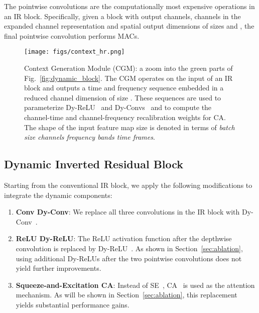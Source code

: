 \documentclass[lettersize,journal]{IEEEtran}
\begin{document}
The pointwise convolutions are the computationally most expensive operations in an IR block. Specifically, given a block with  output channels,  channels in the expanded channel representation and spatial output dimensions of sizes  and , the final pointwise convolution performs  MACs.

\begin{figure}[t]
\centering
{\texttt{[image: figs/context\_hr.png]}}
\caption{Context Generation Module (CGM): a zoom into the green parts of Fig.~\ref{fig:dynamic_block}. The CGM operates on the input of an IR block and outputs a time and frequency sequence embedded in a reduced channel dimension of size . These sequences are used to parameterize Dy-ReLU~\cite{chen2020dynamic_relu} and Dy-Convs~\cite{chen2020dynamic_conv} and to compute the channel-time and channel-frequency recalibration weights for CA. The shape of the input feature map size is denoted in terms of \textit{batch size  channels  frequency bands  time frames}.}\label{fig:context_generation}\end{figure} 


\subsection{Dynamic Inverted Residual Block}
\label{subsec:dynamic_block}



Starting from the conventional IR block, we apply the following modifications to integrate the dynamic components:
\begin{enumerate}
    \item \textbf{Conv  Dy-Conv}: We replace all three  convolutions in the IR block with Dy-Conv~\cite{chen2020dynamic_conv}. 
    \item \textbf{ReLU  Dy-ReLU}: The ReLU activation function after the depthwise convolution is replaced by Dy-ReLU~\cite{chen2020dynamic_relu}. As shown in Section~\ref{sec:ablation}, using additional Dy-ReLUs after the two pointwise convolutions does not yield further improvements.
    \item \textbf{Squeeze-and-Excitation  CA}: Instead of SE~\cite{Hu18Squeeze}, CA~\cite{hou2021coordinate} is used as the attention mechanism. As will be shown in Section~\ref{sec:ablation}, this replacement yields substantial performance gains.
\end{enumerate}
\end{document}
